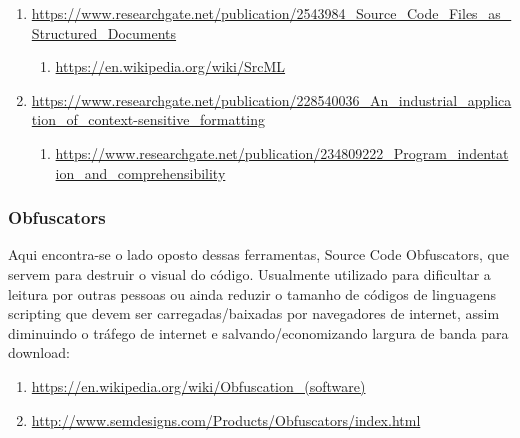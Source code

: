 \begin{englishtext}
\begin{sloppypar}
\begin{bluebox}
\begin{enumerate}[leftmargin=*,parsep=0pt]
    \item \url{https://www.researchgate.net/publication/2543984_Source_Code_Files_as_Structured_Documents}
    \begin{enumerate}[nolistsep,topsep=0pt,label=$\star$]
        \item \url{https://en.wikipedia.org/wiki/SrcML}
    \end{enumerate}

    \item \url{https://www.researchgate.net/publication/228540036_An_industrial_application_of_context-sensitive_formatting}
    \begin{enumerate}[nolistsep,topsep=0pt,label=$\star$]
        \item \url{https://www.researchgate.net/publication/234809222_Program_indentation_and_comprehensibility}
    \end{enumerate}

\end{enumerate}
\end{bluebox}
\end{sloppypar}


\subsubsection{Obfuscators}

    Aqui encontra-se o lado oposto dessas ferramentas, Source Code Obfuscators, que servem para
    destruir o visual do código. Usualmente utilizado para dificultar a leitura por outras pessoas
    ou ainda reduzir o tamanho de códigos de linguagens scripting que devem ser carregadas/baixadas
    por navegadores de internet, assim diminuindo o tráfego de internet e salvando/economizando
    largura de banda para download:

    \begin{sloppypar}
    \begin{bluebox}\RaggedRight
    \begin{enumerate}[leftmargin=*,parsep=0pt]

    \item \url{https://en.wikipedia.org/wiki/Obfuscation_(software)}

    \item \url{http://www.semdesigns.com/Products/Obfuscators/index.html}

    \end{enumerate}
    \end{bluebox}
    \end{sloppypar}

\end{englishtext}


\lang{}{}


